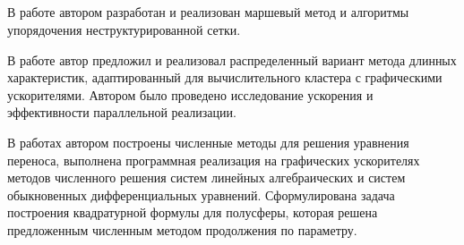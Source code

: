 

\renewcommand{\refname}{\large Публикации автора по теме диссертации}
\nocite{*}
\insertbiblioauthor                          %

\subsection*{\contribution}
В работе \cite{skalko2014} автором разработан и реализован маршевый метод и алгоритмы упорядочения неструктурированной сетки.

В работе \cite{tsybulin2015a} автор предложил и реализовал распределенный вариант метода длинных характеристик, адаптированный для вычислительного кластера с графическими ускорителями. Автором было проведено исследование ускорения и эффективности параллельной реализации.

В работах \cite{tsybulin2015b, miptconf55, miptconf56, miptconf57, miptconf54} автором построены численные методы для решения уравнения переноса, выполнена программная реализация на графических ускорителях методов численного решения систем линейных алгебраических и систем обыкновенных дифференциальных уравнений. Сформулирована задача построения квадратурной формулы для полусферы, которая решена предложенным численным методом продолжения по параметру.
